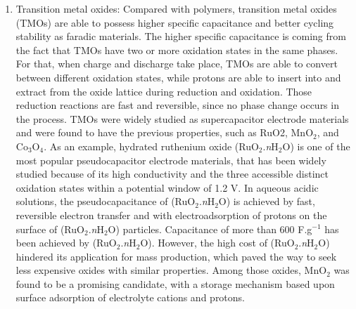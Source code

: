 \documentclass[reprint,amsmath,amssymb,aps,floatfix,
]{revtex4-2}
\begin{document}
\begin{enumerate}
    \item Transition metal oxides: Compared with polymers, transition metal oxides (TMOs) are able to possess higher specific capacitance and better cycling stability as faradic materials. The higher specific capacitance is coming from the fact that TMOs have two or more oxidation states in the same phases. For that, when charge and discharge take place, TMOs are able to convert between different oxidation states, while protons are able to insert into and extract from the oxide lattice during reduction and oxidation. Those reduction reactions are fast and reversible, since no phase change occurs in the process. TMOs were widely studied as supercapacitor electrode materials and were found to  have the previous properties, such as RuO2,\cite{Jeffrey2003} MnO$_2$,\cite{Toupin2004} and Co$_3$O$_4$.\cite{Yanyan2014} As an example, hydrated ruthenium oxide (RuO$_2$.{\it n}H$_2$O) is one of the most popular pseudocapacitor electrode materials, that has been widely studied because of its high conductivity and the three accessible distinct oxidation states within a potential window of 1.2 V.\cite{Rodgers2009} In aqueous acidic solutions, the pseudocapacitance of (RuO$_2$.{\it n}H$_2$O) is achieved by fast, reversible electron transfer and with electroadsorption of protons on the surface of (RuO$_2$.{\it n}H$_2$O) particles. Capacitance of more than 600 F.g$^{-1}$ has been achieved by (RuO$_2$.{\it n}H$_2$O).\cite{Patake2010} However, the high cost of (RuO$_2$.{\it n}H$_2$O) hindered its application for mass production, which paved the way to seek less expensive oxides with similar properties. Among those oxides, MnO$_2$ was found to be a promising candidate, with a storage mechanism based upon surface adsorption of electrolyte cations and protons.\cite{Pang2000}

\end{enumerate}
\end{document}
